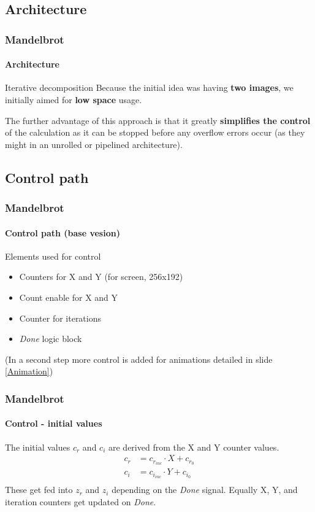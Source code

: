 \documentclass{beamer}
\begin{document}
\subsection{Architecture}
\begin{frame}
    \frametitle{Mandelbrot}
    \framesubtitle{Architecture}
    \begin{block}{Iterative decomposition}
        Because the initial idea was having \textbf{two images},
        we initially aimed for \textbf{low space} usage.

        The further advantage of this approach is that it greatly \textbf{simplifies the control} of the calculation as it can be stopped before any overflow errors occur (as they might in an unrolled or pipelined architecture).
    \end{block}
\end{frame}

\subsection{Control path}
\begin{frame}
    \frametitle{Mandelbrot}
    \framesubtitle{Control path (base vesion)}
    \begin{block}{ Elements used for control}

        \begin{itemize}
            \item Counters for X and Y (for screen, 256x192)
            \item Count enable for X and Y
            \item Counter for iterations
            \item \emph{Done} logic block
        \end{itemize}
    \end{block}

    (In a second step more control is added for animations detailed in slide \ref{Animation})
\end{frame}


\begin{frame}
    \frametitle{Mandelbrot}
    \framesubtitle{Control - initial values}
    The initial values $c_r$ and $c_i$ are derived from the X and Y counter values.
    \begin{equation}
        \label{eq:startval}
        \begin{split}
            c_r &= c_{r_{inc}}  \cdot X + c_{r_0}\\
            c_i &= c_{i_{inc}}  \cdot Y + c_{i_0}\\
        \end{split}
    \end{equation}
    These get fed into $z_r$ and $z_i$ depending on the \emph{Done} signal.
    Equally X, Y, and iteration counters get updated on \emph{Done}.
\end{frame}
\end{document}
